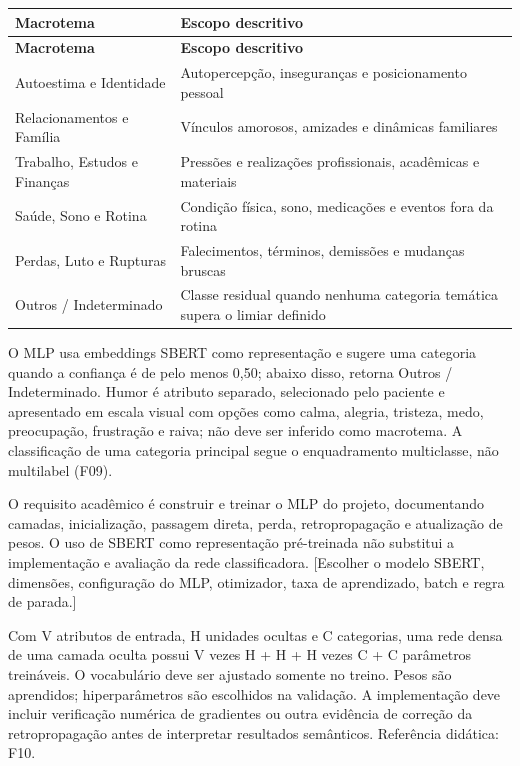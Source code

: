 \documentclass[11pt,a4paper]{article}
\newcommand{\pendencia}[1]{\textcolor{pendente}{[#1]}}
\begin{document}
\begingroup\small
\begin{longtable}{>{\raggedright\arraybackslash}p{}>{\raggedright\arraybackslash}p{}}
\toprule
\textbf{Macrotema} & \textbf{Escopo descritivo} \\ \midrule\endfirsthead
\toprule
\textbf{Macrotema} & \textbf{Escopo descritivo} \\ \midrule\endhead
\bottomrule\endfoot
Autoestima e Identidade & Autopercepção, inseguranças e posicionamento pessoal \\[3pt]
Relacionamentos e Família & Vínculos amorosos, amizades e dinâmicas familiares \\[3pt]
Trabalho, Estudos e Finanças & Pressões e realizações profissionais, acadêmicas e materiais \\[3pt]
Saúde, Sono e Rotina & Condição física, sono, medicações e eventos fora da rotina \\[3pt]
Perdas, Luto e Rupturas & Falecimentos, términos, demissões e mudanças bruscas \\[3pt]
Outros / Indeterminado & Classe residual quando nenhuma categoria temática supera o limiar definido \\[3pt]
\end{longtable}
\endgroup
O MLP usa embeddings SBERT como representação e sugere uma categoria quando a confiança é de pelo menos 0,50; abaixo disso, retorna Outros / Indeterminado. Humor é atributo separado, selecionado pelo paciente e apresentado em escala visual com opções como calma, alegria, tristeza, medo, preocupação, frustração e raiva; não deve ser inferido como macrotema. A classificação de uma categoria principal segue o enquadramento multiclasse, não multilabel (F09).

O requisito acadêmico é construir e treinar o MLP do projeto, documentando camadas, inicialização, passagem direta, perda, retropropagação e atualização de pesos. O uso de SBERT como representação pré-treinada não substitui a implementação e avaliação da rede classificadora. \pendencia{Escolher o modelo SBERT, dimensões, configuração do MLP, otimizador, taxa de aprendizado, batch e regra de parada.}

Com V atributos de entrada, H unidades ocultas e C categorias, uma rede densa de uma camada oculta possui V vezes H + H + H vezes C + C parâmetros treináveis. O vocabulário deve ser ajustado somente no treino. Pesos são aprendidos; hiperparâmetros são escolhidos na validação. A implementação deve incluir verificação numérica de gradientes ou outra evidência de correção da retropropagação antes de interpretar resultados semânticos. Referência didática: F10.
\end{document}
